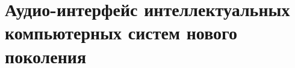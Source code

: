 \chapter{Аудио-интерфейс интеллектуальных компьютерных систем нового поколения}
\label{chapter_audio_interfaces}


%